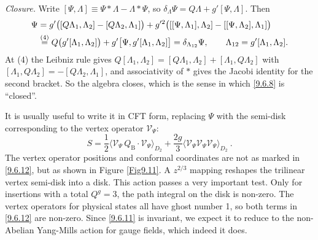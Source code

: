 \begin{tcolorbox}[breakable]
\begin{remark}
		\emph{Closure.} Write $[\Psi,\Lambda]\equiv\Psi*\Lambda-\Lambda*\Psi$, so $\delta_\Lambda\Psi=Q\Lambda+g'[\Psi,\Lambda]$. Then
		\begin{align*}
			[\delta_1,\delta_2]\Psi&=g'\bigl([Q\Lambda_1,\Lambda_2]-[Q\Lambda_2,\Lambda_1]\bigr)+g'^2\bigl([[\Psi,\Lambda_1],\Lambda_2]-[[\Psi,\Lambda_2],\Lambda_1]\bigr)\\
			&\eqs{4}Q\bigl(g'[\Lambda_1,\Lambda_2]\bigr)+g'\bigl[\Psi,g'[\Lambda_1,\Lambda_2]\bigr]=\delta_{\Lambda_{12}}\Psi,\qquad\Lambda_{12}=g'[\Lambda_1,\Lambda_2] .
		\end{align*}
		At (4) the Leibniz rule gives $Q[\Lambda_1,\Lambda_2]=[Q\Lambda_1,\Lambda_2]+[\Lambda_1,Q\Lambda_2]$ with $[\Lambda_1,Q\Lambda_2]=-[Q\Lambda_2,\Lambda_1]$, and associativity of $*$ gives the Jacobi identity for the second bracket. So the algebra closes, which is the sense in which \eqref{9.6.8} is ``closed''.
	\end{remark}
\end{tcolorbox}
It is usually useful to write it in CFT form, replacing $\Psi$ with the semi-disk corresponding to the vertex operator $\mathscr{V}_{\Psi}$:
\begin{equation}
	S=\frac{1}{2}\langle\mathscr{V}_{\Psi} \,Q_{\mathrm{B}} \cdot \mathscr{V}_{\Psi}\rangle_{D_{2}} + 
	\frac{2 g}{3}\langle\mathscr{V}_{\Psi} \mathscr{V}_{\Psi} \mathscr{V}_{\Psi}\rangle_{D_{2}} \:. \label{9.6.12}
\end{equation}
The vertex operator positions and conformal coordinates are not as marked in \eqref{9.6.12}, but as shown in Figure \ref{Fig9.11}.
A $z^{2 / 3}$ mapping reshapes the trilinear vertex semi-disk into a disk. 
This action passes a very important test. Only for insertions with a total $Q^{g}=3$, the path integral on the disk is non-zero. The vertex operators for physical states all have ghost number 1, so both terms in \eqref{9.6.12} are non-zero. 
Since \eqref{9.6.11} is invariant, we expect it to reduce to the non-Abelian Yang-Mills action for gauge fields, which indeed it does.


